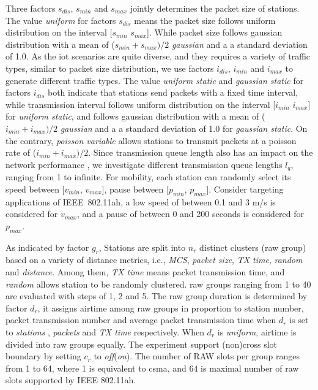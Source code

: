Three factors $s_\textit{dis}$, $s_\textit{min}$ and $s_\textit{max}$ jointly determines the packet size of stations. The value \textit{uniform} for factors $s_\textit{dis}$ means the packet size follows uniform distribution on the interval [$s_\textit{min}$  $s_\textit{max}$]. While packet size follows gaussian distribution with a mean of ($s_\textit{min} + s_\textit{max}) / 2 $ \textit{gaussian} and a a standard deviation of 1.0. As the \gls{iot} scenarios are quite diverse, and they requires a variety of traffic types, similar to packet size distribution, we use factors $i_\textit{dis}$, $i_\textit{min}$  and $i_\textit{max}$ to generate different traffic types. The value \textit{uniform static} and \textit{gaussian static} for factors $i_\textit{dis}$ both indicate that stations send packets with a fixed time interval, while transmission interval follows uniform distribution on the interval [$i_\textit{min}$  $i_\textit{max}$] for \textit{uniform static}, and follows  gaussian distribution with a mean of ($i_\textit{min} + i_\textit{max})/ 2 $ \textit{gaussian} and a a standard deviation of 1.0 for \textit{gaussian static}. On the contrary, \textit{poisson variable} allows stations to transmit packets at a poisson rate of ($i_\textit{min} + i_\textit{max}) / 2 $. Since transmission queue length also has an impact on the network performance \cite{Duffy2007}, we investigate different transmission queue lengths $l_q$, ranging from 1 to infinite.  %
For mobility, each station can randomly select its speed between [$v_{min}$, $v_{max}$], pause between [$p_{min}$, $p_{max}$]. Consider targeting applications of IEEE~802.11ah, a low speed of between 0.1 and 3 m/s is considered for $v_{max}$, and  a pause of between 0 and 200 seconds is considered for $p_{max}$. 


As indicated by factor $g_r$, Stations are split into $n_r$ distinct clusters (\gls{raw} group) based on a variety of distance metrics, i.e., \textit{MCS}, \textit{packet size}, \textit{TX time}, \textit{random} and \textit{distance}. Among them, \textit{TX time} means packet transmission time, and \textit{random} allows station to be randomly clustered. \gls{raw} groups ranging from 1 to 40 are evaluated with steps of 1, 2 and 5. %
The \gls{raw} group duration is determined by factor $d_r$, it assigns airtime among \gls{raw} groups in proportion to station number, packet transmission number and average packet transmission time when $d_r$ is set to \textit{stations} , \textit{packets} and \textit{TX time} respectively. When $d_r$ is \textit{uniform}, airtime is divided into \gls{raw} groups equally. The experiment support (non)cross slot boundary by setting $c_r$ to \textit{off}(\textit{on}). The number of RAW slots per group ranges from 1 to 64, where 1 is equivalent to \gls{csma}, and $64$ is maximal number of \gls{raw} slots supported by IEEE 802.11ah.


